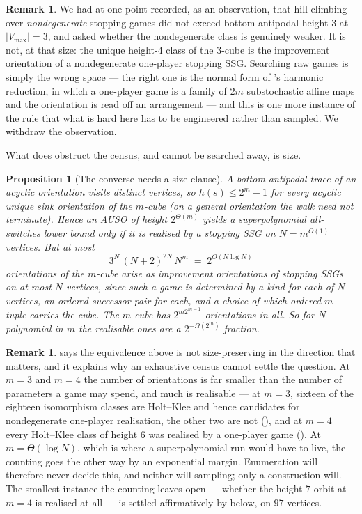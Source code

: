 \documentclass[11pt]{article}
\theoremstyle{plain}
\newtheorem{proposition}[theorem]{Proposition}
\theoremstyle{definition}
\newtheorem{remark}[theorem]{Remark}
\newcommand{\Vmax}{V_{\max}}
\begin{document}
\begin{remark}
We had at one point recorded, as an observation, that hill climbing over
\emph{nondegenerate} stopping games did not exceed bottom-antipodal height $3$
at $|\Vmax|=3$, and asked whether the nondegenerate class is genuinely weaker.
It is not, at that size: the unique height-$4$ class of the $3$-cube is the
improvement orientation of a nondegenerate one-player stopping SSG. Searching
raw games is simply the wrong space --- the right one is the normal form of
's harmonic reduction, in which a one-player game is a
family of $2m$ substochastic affine maps and the orientation is read off an
arrangement --- and this is one more instance of the rule that what is hard here
has to be engineered rather than sampled. We withdraw the observation.

What does obstruct the census, and cannot be searched away, is size.
\end{remark}


\begin{proposition}[The converse needs a size clause]\label{prop:auso-size}
A bottom-antipodal trace of an acyclic orientation visits distinct vertices,
so $h(s)\le2^{m}-1$ for every acyclic unique sink orientation of the $m$-cube
(on a general orientation the walk need not terminate). Hence an AUSO of height $2^{\Theta(m)}$ yields a
\emph{superpolynomial} all-switches lower bound only if it is realised by a
stopping SSG on $N=m^{O(1)}$ vertices. But at most
\[
  3^{N}\,(N+2)^{2N}\,N^{m}\;=\;2^{O(N\log N)}
\]
orientations of the $m$-cube arise as improvement orientations of stopping SSGs
on at most $N$ vertices, since such a game is determined by a kind for each of
$N$ vertices, an ordered successor pair for each, and a choice of which ordered
$m$-tuple carries the cube. The $m$-cube has $2^{m2^{m-1}}$ orientations in all.
So for $N$ polynomial in $m$ the realisable ones are a $2^{-\Omega(2^{m})}$
fraction.
\end{proposition}

\begin{remark}\label{rem:auso-size}
 says the equivalence above is not size-preserving in the
direction that matters, and it explains why an exhaustive census cannot settle
the question. At $m=3$ and $m=4$ the number of orientations is far smaller than
the number of parameters a game may spend, and much is realisable --- at
$m=3$, sixteen of the eighteen isomorphism classes are Holt--Klee and hence
candidates for nondegenerate one-player realisation, the other two are not
(), and at $m=4$ every Holt--Klee class of height
$6$ was realised by a one-player game (). At $m=\Theta(\log
N)$, which is where a superpolynomial run would have to live, the counting goes
the other way by an exponential margin. Enumeration will therefore never decide
this, and neither will sampling; only a construction will. The smallest
instance the counting leaves open --- whether the height-$7$ orbit at
$m=4$ is realised at all --- is settled affirmatively by
 below, on $97$ vertices.
\end{remark}
\end{document}
